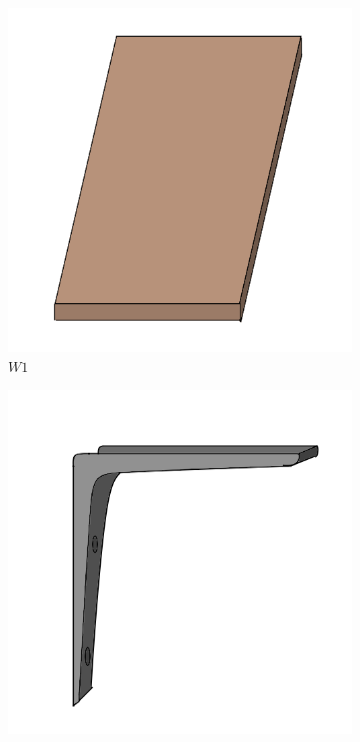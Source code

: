 \documentclass{subfiles}
\begin{document}
    \begin{figure}[ht]
        \centering
        \begin{subfigure}[b]{0.3\textwidth}
            \centering
            \includegraphics[width=\textwidth]{Ressources/Piece_W1.png}
            \caption{$W1$}
            \label{fig:W1}
        \end{subfigure}
        \hfill
        \begin{subfigure}[b]{0.3\textwidth}
            \centering
            \includegraphics[width=\textwidth]{Ressources/Piece_M1.png}

\end{subfigure}
\end{figure}
\end{document}

